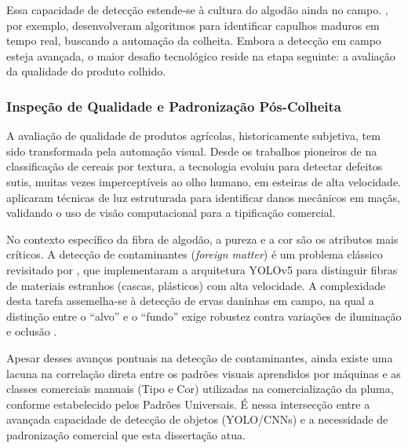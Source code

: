         Essa capacidade de detecção estende-se à cultura do algodão ainda no campo. , por exemplo, desenvolveram algoritmos para identificar capulhos maduros em tempo real, buscando a automação da colheita. Embora a detecção em campo esteja avançada, o maior desafio tecnológico reside na etapa seguinte: a avaliação da qualidade do produto colhido.

    \subsubsection{Inspeção de Qualidade e Padronização Pós-Colheita}

        A avaliação de qualidade de produtos agrícolas, historicamente subjetiva, tem sido transformada pela automação visual. Desde os trabalhos pioneiros de  na classificação de cereais por textura, a tecnologia evoluiu para detectar defeitos sutis, muitas vezes imperceptíveis ao olho humano, em esteiras de alta velocidade.  aplicaram técnicas de luz estruturada para identificar danos mecânicos em maçãs, validando o uso de visão computacional para a tipificação comercial.

        No contexto específico da fibra de algodão, a pureza e a cor são os atributos mais críticos. A detecção de contaminantes (\textit{foreign matter}) é um problema clássico revisitado por , que implementaram a arquitetura YOLOv5 para distinguir fibras de materiais estranhos (cascas, plásticos) com alta velocidade. A complexidade desta tarefa assemelha-se à detecção de ervas daninhas em campo, na qual a distinção entre o ``alvo'' e o ``fundo'' exige robustez contra variações de iluminação e oclusão \cite{juwono2023, subeesh2022}.
        
        Apesar desses avanços pontuais na detecção de contaminantes, ainda existe uma lacuna na correlação direta entre os padrões visuais aprendidos por máquinas e as classes comerciais manuais (Tipo e Cor) utilizadas na comercialização da pluma, conforme estabelecido pelos Padrões Universais. É nessa intersecção entre a avançada capacidade de detecção de objetos (YOLO/CNNs) e a necessidade de padronização comercial que esta dissertação atua.
